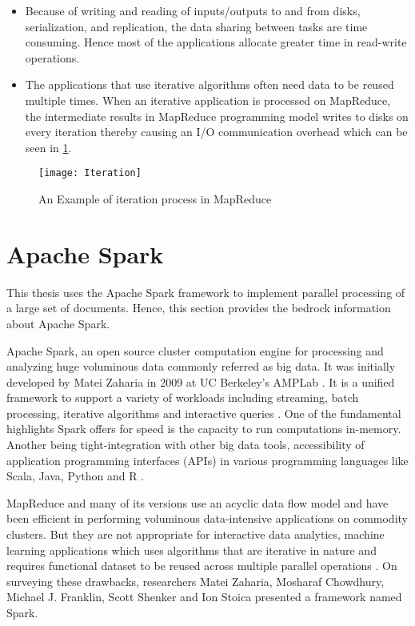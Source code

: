 \begin{itemize}
\item Because of writing and reading of inputs/outputs to and from disks, serialization, and replication, the data sharing between tasks are time consuming. Hence most of the applications allocate greater time in read-write operations.

\item The applications that use iterative algorithms often need data to be reused multiple times. When an iterative application is processed on MapReduce, the intermediate results in MapReduce programming model writes to disks on every iteration thereby causing an I/O communication overhead which can be seen in \ref{fig: iteration}.
\end{itemize}

\begin{figure}[htbp]
	\centering
		\texttt{[image: Iteration]}
	\caption{An Example of iteration process in MapReduce \cite{Jonnalagadda2016} }
	\label{fig: iteration}
\end{figure}



\section{Apache Spark}
\label{section: apache spark}
This thesis uses the Apache Spark framework to implement parallel processing of a large set of documents. Hence, this section provides the bedrock information about Apache Spark.

\par Apache Spark, an open source cluster computation engine for processing and analyzing huge voluminous data commonly referred as big data. It was initially developed by Matei Zaharia in 2009 at UC Berkeley's AMPLab \cite{Jonnalagadda2016}. It is a unified framework to support a variety of workloads including streaming, batch processing, iterative algorithms and interactive queries \cite{karau2015learning}. One of the fundamental highlights Spark offers for speed is the capacity to run computations in-memory. Another being tight-integration with other big data tools, accessibility of application programming interfaces (APIs) in various programming languages like Scala, Java, Python and R \cite{karau2015learning}. 

\par MapReduce and many of its versions use an acyclic data flow model and have been efficient in performing voluminous data-intensive applications on commodity clusters. But they are not appropriate for interactive data analytics, machine learning applications which uses algorithms that are iterative in nature and requires functional dataset to be reused across multiple parallel operations \cite{zaharia2010spark}. On surveying these drawbacks, researchers Matei Zaharia, Mosharaf Chowdhury, Michael J. Franklin, Scott Shenker and Ion Stoica presented a framework named Spark.
 
